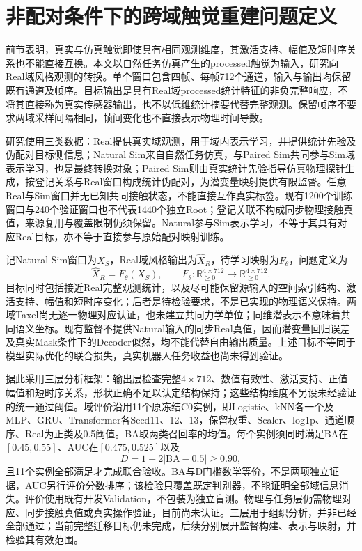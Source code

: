 \section{非配对条件下的跨域触觉重建问题定义}
\label{sec:ch05_unpaired_problem}

前节表明，真实与仿真触觉即使具有相同观测维度，其激活支持、幅值及短时序关系也不能直接互换。本文以自然任务仿真产生的processed触觉为输入，研究向Real域风格观测的转换。单个窗口包含四帧、每帧712个通道，输入与输出均保留既有通道及帧序。目标输出是具有Real域processed统计特征的非负完整响应，不将其直接称为真实传感器输出，也不以低维统计摘要代替完整观测。保留帧序不要求两域采样间隔相同，帧间变化也不直接表示物理时间导数。

研究使用三类数据：Real提供真实域观测，用于域内表示学习，并提供统计先验及伪配对目标侧信息；Natural Sim来自自然任务仿真，与Paired Sim共同参与Sim域表示学习，也是最终转换对象；Paired Sim则由真实统计先验指导仿真物理探针生成，按登记关系与Real窗口构成统计伪配对，为潜变量映射提供有限监督。任意Real与Sim窗口并无已知共同接触状态，不能直接互作真实标签。现有1200个训练窗口与240个验证窗口也不代表1440个独立Root；登记关联不构成同步物理接触真值，来源复用与覆盖限制仍须保留。Natural参与Sim表示学习，不等于其具有对应Real目标，亦不等于直接参与原始配对映射训练。

记Natural Sim窗口为$X_S$，Real域风格输出为$\widehat X_R$，待学习映射为$F_\theta$，问题定义为
\begin{equation}
 \widehat X_R=F_\theta(X_S),\qquad
 F_\theta:\mathbb R_{\geq0}^{4\times712}
 \rightarrow\mathbb R_{\geq0}^{4\times712}.
 \label{eq:ch05_unpaired_mapping}
\end{equation}
目标同时包括接近Real完整观测统计，以及尽可能保留源输入的空间索引结构、激活支持、幅值和短时序变化；后者是待检验要求，不是已实现的物理语义保持。两域Taxel尚无逐一物理对应认证，也未建立共同力学单位；同维潜表示不意味着共同语义坐标。现有监督不提供Natural输入的同步Real真值，因而潜变量回归误差及真实Mask条件下的Decoder似然，均不能代替自由输出质量。上述目标不等同于模型实际优化的联合损失，真实机器人任务收益也尚未得到验证。

据此采用三层分析框架：输出层检查完整$4\times712$、数值有效性、激活支持、正值幅值和短时序关系，形状正确不足以认定结构保持；这些结构维度不另设未经验证的统一通过阈值。域评价沿用11个原冻结C0实例，即Logistic、kNN各一个及MLP、GRU、Transformer各Seed11、12、13，保留权重、Scaler、log1p、通道顺序、Real为正类及0.5阈值。BA取两类召回率的均值。每个实例须同时满足BA在$[0.45,0.55]$、AUC在$[0.475,0.525]$以及
\begin{equation}
 D=1-2|\mathrm{BA}-0.5|\geq0.90,
 \label{eq:ch05_domain_confusion_target}
\end{equation}
且11个实例全部满足才完成联合验收。BA与D门槛数学等价，不是两项独立证据，AUC另行评价分数排序；该检验只覆盖既定判别器，不能证明全部域信息消失。评价使用既有开发Validation，不包装为独立盲测。物理与任务层仍需物理对应、同步接触真值或真实操作验证，目前尚未认证。三层用于组织分析，并非已经全部通过；当前完整迁移目标仍未完成，后续分别展开监督构建、表示与映射，并检验其有效范围。
